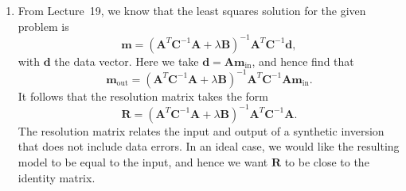 \documentclass[a4paper,10pt]{paper}
\begin{document}
\begin{enumerate}
\begin{enumerate}
turning radius, the change of variables in (b) fails, and the velocity within the zone cannot be recovered from the travel-time curve at all; 
the zone produces a gap in the curve (a shadow zone) followed by a jump in $\Delta$, and the depths inferred below it are in error unless the 
zone is accounted for separately. At a discontinuity across which the velocity increases with depth, $\eta$ jumps downwards and there 
is a range of ray parameters for which the rays are totally reflected at the interface. Rays turning just beneath it emerge at larger epicentral 
angles than those turning just above, so the travel-time curve folds back on itself to form a \emph{triplication}: over a range of $\Delta$ 
three arrivals are seen, and $q(\Delta)$ is multi-valued. The inversion remains valid provided the branches are correctly identified, 
since $\Delta(q)$ itself remains single-valued.

\end{enumerate}

\item From Lecture~19, we know that the least squares solution for the given problem is
\begin{equation*}
    \mathbf{m}=(\mathbf{A}^{T}\mathbf{C}^{-1}\mathbf{A}+\lambda \mathbf{B})^{-1}\mathbf{A}^{T}\mathbf{C}^{-1}\mathbf{d},
\end{equation*}
with $\mathbf{d}$ the data vector. Here we take $\mathbf{d}=\mathbf{A}\mathbf{m}_{\mathrm{in}}$, and hence find that
\begin{equation*}
    \mathbf{m}_{\mathrm{out}}=(\mathbf{A}^{T}\mathbf{C}^{-1}\mathbf{A}+\lambda \mathbf{B})^{-1}\mathbf{A}^{T}\mathbf{C}^{-1}\mathbf{A}\mathbf{m}_{\mathrm{in}}.
\end{equation*}
It follows that the resolution matrix takes the form
\begin{equation*}
    \mathbf{R}=(\mathbf{A}^{T}\mathbf{C}^{-1}\mathbf{A}+\lambda \mathbf{B})^{-1}\mathbf{A}^{T}\mathbf{C}^{-1}\mathbf{A}.
\end{equation*}
The resolution matrix relates the input and output of a synthetic inversion that does not include data errors. In an ideal case, we would like the resulting model to be equal to the input, and hence we want $\mathbf{R}$ to be close to the identity matrix.


\end{enumerate}
\end{document}
